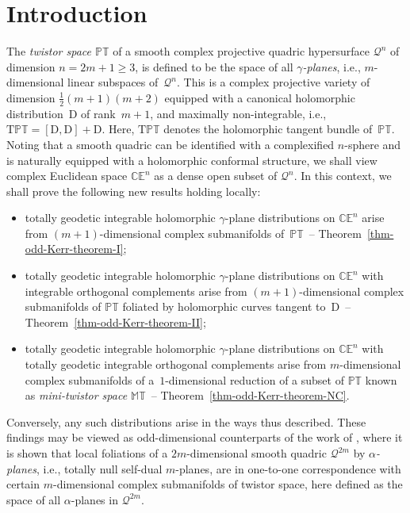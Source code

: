 \documentclass[pdftex]{sigma}
\numberwithin{equation}{section}
\newcommand{\mc} [1]{\mathcal{#1}}
\newcommand{\Drm} {{\mathrm{D}}}
\newcommand{\Tgt} {\mathrm{T}}
\newcommand{\PT} {\mathbb{PT}}
\newcommand{\T} {\mathbb{T}}
\newcommand{\E} {\mathbb{E}}
\newcommand{\M} {\mathbb{M}}
\newcommand{\C} {\mathbb{C}}
\begin{document}
\section{Introduction}
The \emph{twistor space $\PT$} of a smooth complex projective quadric hypersurface $\mc{Q}^n$ of dimension $n=2m+1 \geq 3$, is def\/ined to be the space of all \emph{$\gamma$-planes}, i.e., $m$-dimensional linear subspaces of~$\mc{Q}^n$. This is a complex projective variety of dimension $\frac{1}{2}(m+1)(m+2)$ equipped with a canonical holomorphic distribution~$\mathrm{D}$ of rank~$m+1$, and maximally non-integrable, i.e., $\Tgt \PT = [ \mathrm{D} , \mathrm{D} ] + \mathrm{D}$. Here, $\Tgt \PT$ denotes the holomorphic tangent bundle of~$\PT$. Noting that a smooth quadric can be identif\/ied with a complexif\/ied $n$-sphere and is naturally equipped with a holomorphic conformal structure, we shall view complex Euclidean space $\C \E^n$ as a dense open subset of $\mc{Q}^n$. In this context, we shall prove the following new results holding locally:
\begin{itemize}\itemsep=0pt
\item totally geodetic integrable holomorphic $\gamma$-plane distributions on $\C \E^n$ arise from $(m+1)$-dimensional complex submanifolds of~$\PT$~-- Theorem~\ref{thm-odd-Kerr-theorem-I};
\item totally geodetic integrable holomorphic $\gamma$-plane distributions on $\C \E^n$ with integrable orthogonal complements arise from $(m+1)$-dimensional complex submanifolds of $\PT$ foliated by holomorphic curves tangent to~$\Drm$~-- Theorem~\ref{thm-odd-Kerr-theorem-II};
\item totally geodetic integrable holomorphic $\gamma$-plane distributions on $\C \E^n$ with totally geodetic integrable orthogonal complements arise from $m$-dimensional complex submanifolds of a~$1$-dimensional reduction of a subset of $\PT$ known as \emph{mini-twistor space $\M\T$}~-- Theorem~\ref{thm-odd-Kerr-theorem-NC}.
\end{itemize}
Conversely, any such distributions arise in the ways thus described. These f\/indings may be viewed as odd-dimensional counterparts of the work of \cite{Hughston1988}, where it is shown that local foliations of a $2m$-dimensional smooth quadric $\mc{Q}^{2m}$ by \emph{$\alpha$-planes}, i.e., totally null self-dual $m$-planes, are in one-to-one correspondence with certain $m$-dimensional complex submanifolds of twistor space, here def\/ined as the space of all $\alpha$-planes in $\mc{Q}^{2m}$.
\end{document}
